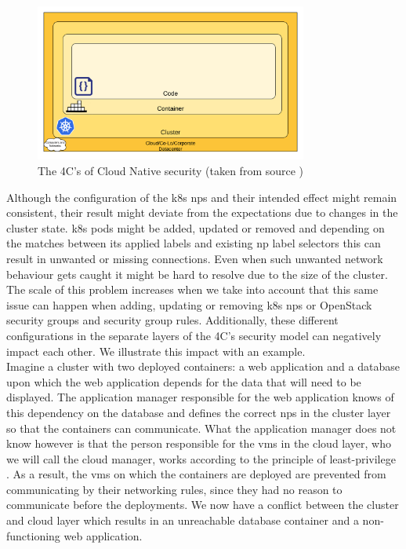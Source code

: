 \begin{figure}[htbp]
  \centering
  \includegraphics[width=0.8\textwidth]{images/4c.png}
  \caption{The 4C's of Cloud Native security (taken from source \cite{4cs})}
  \label{fig:4cs}
\end{figure}

Although the configuration of the \acrshort{k8s} \acrshort{np}s and their intended effect might remain consistent, their result might deviate from the expectations due to changes in the cluster state. \acrshort{k8s} pods might be added, updated or removed and depending on the matches between its applied labels and existing \acrshort{np} label selectors this can result in unwanted or missing connections. Even when such unwanted network behaviour gets caught it might be hard to resolve due to the size of the cluster. The scale of this problem increases when we take into account that this same issue can happen when adding, updating or removing \acrshort{k8s} \acrshort{np}s or OpenStack security groups and security group rules. Additionally, these different configurations in the separate layers of the 4C's security model can negatively impact each other. We illustrate this impact with an example.
\\[10pt]

Imagine a cluster with two deployed containers: a web application and a database upon which the web application depends for the data that will need to be displayed. The application manager responsible for the web application knows of this dependency on the database and defines the correct \acrshort{np}s in the cluster layer so that the containers can communicate. What the application manager does not know however is that the person responsible for the \acrshort{vm}s in the cloud layer, who we will call the cloud manager, works according to the principle of least-privilege \cite{leastprivilige}. As a result, the \acrshort{vm}s on which the containers are deployed are prevented from communicating by their networking rules, since they had no reason to communicate before the deployments. We now have a conflict between the cluster and cloud layer which results in an unreachable database container and a non-functioning web application.
\\[10pt]

